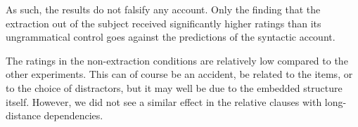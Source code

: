 As such, the results do not falsify any account. Only the finding that the extraction out of the subject received significantly higher ratings than its ungrammatical control goes against the predictions of the syntactic account. 

The ratings in the non-extraction conditions are relatively low compared to the other experiments. This can of course be an accident, be related to the items, or to the choice of distractors, but it may well be due to the embedded structure itself. However, we did not see a similar effect in the relative clauses with long-distance dependencies.

